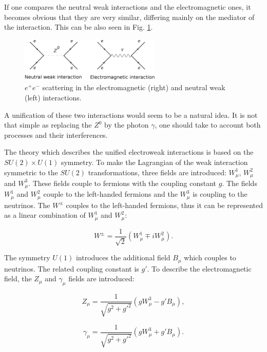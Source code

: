 If one compares the neutral weak interactions and the electromagnetic ones, it becomes obvious that they are very similar, differing mainly on the mediator
of the interaction. This can be also seen in Fig. \ref{fig:em_weak}.

\begin{figure}[h]
  \centering
  \includegraphics[width=0.6\textwidth]{01_Theory_SM/plots/feynz_uniform.png}
  \caption{$e^{+}e^{-}$ scattering in the electromagnetic (right) and neutral weak (left) interactions.}
  \label{fig:em_weak}
\end{figure}

A unification of these two interactions would seem to be a natural idea. It is not that simple as replacing the $Z^{0}$ by the photon $\gamma$, one
should take to account both processes and their interferences.

The theory which describes the unified electroweak interactions is based on the $SU(2) \times U(1)$ symmetry. To make the Lagrangian of the weak interaction
symmetric to the $SU(2)$ transformations, three fields are introduced: $W_{\mu}^{1}$, $W_{\mu}^{2}$ and $W_{\mu}^{3}$. These fields couple to fermions with
the coupling constant $g$. The fields $W_{\mu}^{1}$ and $W_{\mu}^{2}$ couple to the left-handed fermions and
the $W_{\mu}^{3}$ is coupling to the neutrinos. The $W^{\pm}$ couples to the left-handed fermions, thus it can be represented as a linear combination of
$W_{\mu}^{1}$ and $W_{\mu}^{2}$:

\begin{equation}
 W^{\pm} = \frac{1}{\sqrt{2}}(W_{\mu}^{1} \mp iW_{\mu}^{2}).
\end{equation}

The symmetry $U(1)$ introduces the additional field $B_{\mu}$ which couples to neutrinos. The related coupling constant is $g'$. To describe the electromagnetic
field, the $Z_{\mu}$ and $\gamma_{\mu}$ fields are introduced:

\begin{equation}\label{eq:Zmu}
 Z_{\mu} = \frac{1}{\sqrt{g^{2} + g'^{2}}}(gW^{3}_{\mu} - g'B_{\mu}),
\end{equation}

\begin{equation}\label{eq:Amu}
 \gamma_{\mu} = \frac{1}{\sqrt{g^{2} + g'^{2}}}(gW^{3}_{\mu} + g'B_{\mu}).
\end{equation}

